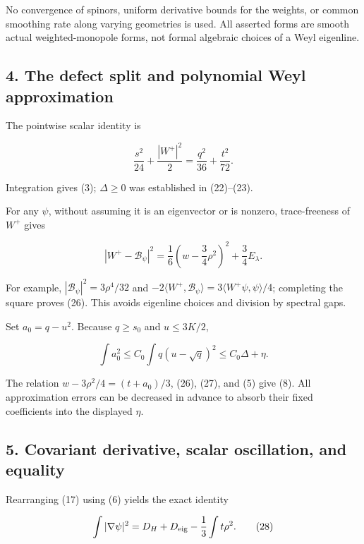 \documentclass[
  11pt,
]{article}
\begin{document}
No convergence of spinors, uniform derivative bounds for the weights, or
common smoothing rate along varying geometries is used. All asserted
forms are smooth actual weighted-monopole forms, not formal algebraic
choices of a Weyl eigenline.

\hypertarget{the-defect-split-and-polynomial-weyl-approximation}{%
\subsection{4. The defect split and polynomial Weyl
approximation}\label{the-defect-split-and-polynomial-weyl-approximation}}

The pointwise scalar identity is

\[
 \frac{s^2}{24}+\frac{|W^+|^2}{2}
 =\frac{q^2}{36}+\frac{t^2}{72}.
 \tag{25}
\]

Integration gives (3); \(\Delta\ge0\) was established in (22)--(23).

For any \(\psi\), without assuming it is an eigenvector or is nonzero,
trace-freeness of \(W^+\) gives

\[
 \boxed{
 |W^+-\mathcal B_\psi|^2
  =\frac16\left(w-\frac34\rho^2\right)^2
                         +\frac34E_\lambda.}
 \tag{26}
\]

For example, \(|\mathcal B_\psi|^2=3\rho^4/32\) and
\(-2\langle W^+,\mathcal B_\psi\rangle =3\langle W^+\psi,\psi\rangle/4\);
completing the square proves (26). This avoids eigenline choices and
division by spectral gaps.

Set \(a_0=q-u^2\). Because \(q\ge s_0\) and \(u\le3K/2\),

\[
 \int a_0^2
 \le C_0\int q(u-\sqrt q)^2\le C_0\Delta+\eta.
 \tag{27}
\]

The relation \(w-3\rho^2/4=(t+a_0)/3\), (26), (27), and (5) give (8).
All approximation errors can be decreased in advance to absorb their
fixed coefficients into the displayed \(\eta\).

\hypertarget{covariant-derivative-scalar-oscillation-and-equality}{%
\subsection{5. Covariant derivative, scalar oscillation, and
equality}\label{covariant-derivative-scalar-oscillation-and-equality}}

Rearranging (17) using (6) yields the exact identity

\[
 \int|\nabla\psi|^2=D_H+D_{\rm eig}-\frac13\int t\rho^2.
 \tag{28}
\]
\end{document}
